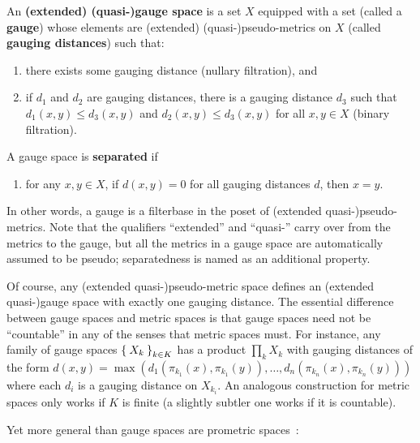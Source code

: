 \documentclass{article}
\begin{document}
\begin{defn}
  An \textbf{(extended) (quasi-)gauge space} is a set $X$ equipped with a set (called a \textbf{gauge}) whose elements are (extended) (quasi-)pseudo-metrics on $X$ (called \textbf{gauging distances}) such that:
  \begin{enumerate}
  \item there exists some gauging distance (nullary filtration), and
  \item if $d_1$ and $d_2$ are gauging distances, there is a gauging distance $d_3$ such that $d_1(x,y)\le d_3(x,y)$ and $d_2(x,y)\le d_3(x,y)$ for all $x,y\in X$ (binary filtration).
  \end{enumerate}
  A gauge space is \textbf{separated} if
  \begin{enumerate}[resume]
  \item for any $x,y\in X$, if $d(x,y)=0$ for all gauging distances $d$, then $x=y$.
  \end{enumerate}
\end{defn}

In other words, a gauge is a filterbase in the poset of (extended quasi-)pseudo-metrics.
Note that the qualifiers ``extended'' and ``quasi-'' carry over from the metrics to the gauge, but all the metrics in a gauge space are automatically assumed to be pseudo; separatedness is named as an additional property.

Of course, any (extended quasi-)pseudo-metric space defines an (extended quasi-)gauge space with exactly one gauging distance.
The essential difference between gauge spaces and metric spaces is that gauge spaces need not be ``countable'' in any of the senses that metric spaces must.
For instance, any family of gauge spaces $\Set{X_k}_{k\in K}$ has a product $\prod_k X_k$ with gauging distances of the form $d(x,y) = \max(d_1(\pi_{k_1}(x),\pi_{k_1}(y)),\dots,d_n(\pi_{k_n}(x),\pi_{k_n}(y)))$ where each $d_i$ is a gauging distance on $X_{k_i}$.
An analogous construction for metric spaces only works if $K$ is finite (a slightly subtler one works if it is countable).

Yet more general than gauge spaces are prometric spaces~\cite{cht:one-setting}:
\end{document}
